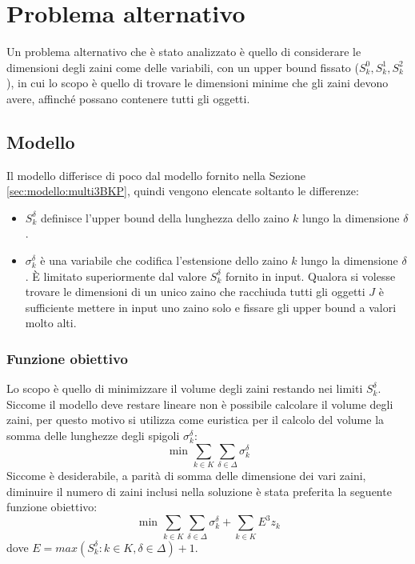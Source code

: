 \section{Problema alternativo}
\label{sec:extension2}
Un problema alternativo che è  stato analizzato è quello di considerare le 
dimensioni degli zaini come delle variabili, con un upper bound fissato 
($S_k^0, S_k^1, S_k^2$), in cui lo scopo è quello di trovare le dimensioni 
minime che gli zaini devono avere, affinché possano contenere tutti gli oggetti.

\subsection{Modello}
Il modello differisce di poco dal modello fornito nella
Sezione \ref{sec:modello:multi3BKP}, quindi vengono elencate soltanto le 
differenze:
\begin{itemize}
	\item $S_k^\delta$ definisce l'upper bound della lunghezza dello zaino $k$ 
	lungo la dimensione $\delta$.
	
	\item $\sigma_k^\delta$ è una variabile che codifica l'estensione dello 
	zaino $k$ lungo la dimensione $\delta$. È limitato superiormente dal valore
	$S_k^\delta$ fornito in input.
	Qualora si volesse trovare le dimensioni di un unico zaino che racchiuda 
	tutti gli oggetti $J$ è sufficiente	mettere in input uno zaino solo e 
	fissare gli upper bound a valori molto alti. 
	
\end{itemize}
\subsubsection{Funzione obiettivo}
Lo scopo è quello di minimizzare il volume degli zaini restando nei limiti 
$S_k^\delta$. Siccome il modello deve restare lineare non è possibile calcolare
il volume degli zaini, per questo motivo si utilizza come euristica per il 
calcolo del volume la somma delle lunghezze degli spigoli $\sigma_k^\delta$:
\begin{equation}
\text{ min } \sum_{k \in K} \sum_{\delta \in \Delta} \sigma_k^\delta
\end{equation}
Siccome è desiderabile, a parità di somma delle dimensione dei vari zaini,
diminuire il numero di zaini inclusi nella soluzione è stata preferita la 
seguente funzione obiettivo:
\begin{equation}
\text{ min } \sum_{k \in K} \sum_{\delta \in \Delta} \sigma_k^\delta 
+ \sum_{k \in K} E^3 z_k
\end{equation}
dove $E = max(S_k^\delta : k \in K, \delta \in \Delta) + 1$.

